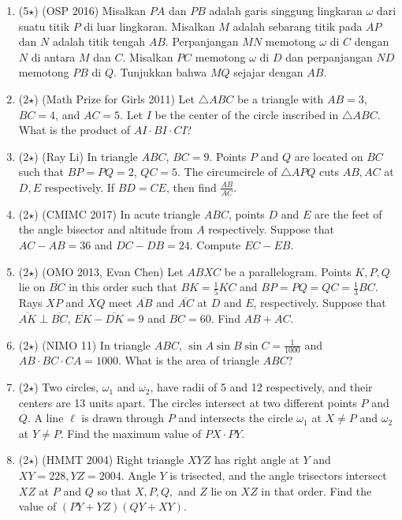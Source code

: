 \documentclass[12pt]{scrartcl}
\begin{document}
\begin{enumerate}
    \item (5$\star$) (OSP 2016) Misalkan $PA$ dan $PB$ adalah garis singgung lingkaran $\omega$ dari suatu titik $P$ di luar lingkaran. Misalkan $M$ adalah sebarang titik pada $AP$ dan $N$ adalah titik tengah $AB$. Perpanjangan $MN$ memotong $\omega$ di $C$ dengan $N$ di antara $M$ dan $C$. Misalkan $PC$ memotong $\omega$ di $D$ dan perpanjangan $ND$ memotong $PB$ di $Q$. Tunjukkan bahwa $MQ$ sejajar dengan $AB$.

    \item (2$\star$) (Math Prize for Girls 2011) Let $\triangle ABC$ be a triangle with $AB=3$, $BC=4$, and $AC=5$. Let $I$ be the center of the circle inscribed in $\triangle ABC$. What is the product of $AI \cdot BI \cdot CI$?

    \item (2$\star$) (Ray Li) In triangle $ABC$, $BC=9$. Points $P$ and $Q$ are located on $BC$ such that $BP=PQ=2$, $QC=5$. The circumcircle of $\triangle APQ$ cuts $AB, AC$ at $D, E$ respectively. If $BD=CE$, then find $\frac{AB}{AC}$.

    \item (2$\star$) (CMIMC 2017) In acute triangle $ABC$, points $D$ and $E$ are the feet of the angle bisector and altitude from $A$ respectively. Suppose that $AC-AB=36$ and $DC-DB=24$. Compute $EC-EB$.

    \item (2$\star$) (OMO 2013, Evan Chen) Let $ABXC$ be a parallelogram. Points $K,P,Q$ lie on $\overline{BC}$ in this order such that $BK = \frac{1}{5}KC$ and $BP=PQ=QC = \frac{1}{3}BC$. Rays $XP$ and $XQ$ meet $\overline{AB}$ and $\overline{AC}$ at $D$ and $E$, respectively. Suppose that $\overline{AK} \perp \overline{BC}$, $\overline{EK}-\overline{DK}=9$ and $BC=60$. Find $AB+AC$.

    \item (2$\star$) (NIMO 11) In triangle $ABC$, $\sin A \sin B \sin C = \frac{1}{1000}$ and $AB \cdot BC \cdot CA = 1000$. What is the area of triangle $ABC$? 

    \item (2$\star$) Two circles, $\omega_1$ and $\omega_2$, have radii of 5 and 12 respectively, and their centers are 13 units apart. The circles intersect at two different points $P$ and $Q$. A line $\ell$ is drawn through $P$ and intersects the circle $\omega_1$ at $X \neq P$ and $\omega_2$ at $Y \neq P$. Find the maximum value of $PX \cdot PY$.

    \item (2$\star$) (HMMT 2004) Right triangle $XYZ$ has right angle at $Y$ and $XY=228, YZ=2004$. Angle $Y$ is trisected, and the angle trisectors intersect $XZ$ at $P$ and $Q$ so that $X, P, Q,$ and $Z$ lie on $XZ$ in that order. Find the value of $(PY+YZ)(QY+XY)$.


\end{enumerate}
\end{document}
